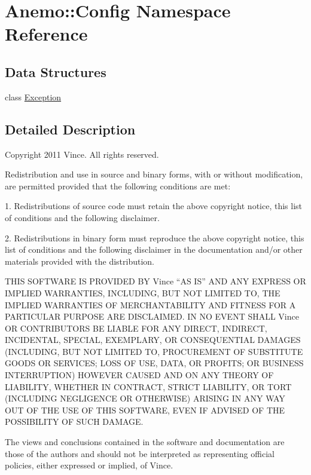 \hypertarget{namespace_anemo_1_1_config}{
\section{Anemo::Config Namespace Reference}
\label{namespace_anemo_1_1_config}
}
\subsection*{Data Structures}
\begin{DoxyCompactItemize}
\item 
class \hyperlink{class_anemo_1_1_config_1_1_exception}{Exception}
\end{DoxyCompactItemize}


\subsection{Detailed Description}
Copyright 2011 Vince. All rights reserved.

Redistribution and use in source and binary forms, with or without modification, are permitted provided that the following conditions are met:

1. Redistributions of source code must retain the above copyright notice, this list of conditions and the following disclaimer.

2. Redistributions in binary form must reproduce the above copyright notice, this list of conditions and the following disclaimer in the documentation and/or other materials provided with the distribution.

THIS SOFTWARE IS PROVIDED BY Vince ``AS IS'' AND ANY EXPRESS OR IMPLIED WARRANTIES, INCLUDING, BUT NOT LIMITED TO, THE IMPLIED WARRANTIES OF MERCHANTABILITY AND FITNESS FOR A PARTICULAR PURPOSE ARE DISCLAIMED. IN NO EVENT SHALL Vince OR CONTRIBUTORS BE LIABLE FOR ANY DIRECT, INDIRECT, INCIDENTAL, SPECIAL, EXEMPLARY, OR CONSEQUENTIAL DAMAGES (INCLUDING, BUT NOT LIMITED TO, PROCUREMENT OF SUBSTITUTE GOODS OR SERVICES; LOSS OF USE, DATA, OR PROFITS; OR BUSINESS INTERRUPTION) HOWEVER CAUSED AND ON ANY THEORY OF LIABILITY, WHETHER IN CONTRACT, STRICT LIABILITY, OR TORT (INCLUDING NEGLIGENCE OR OTHERWISE) ARISING IN ANY WAY OUT OF THE USE OF THIS SOFTWARE, EVEN IF ADVISED OF THE POSSIBILITY OF SUCH DAMAGE.

The views and conclusions contained in the software and documentation are those of the authors and should not be interpreted as representing official policies, either expressed or implied, of Vince. 